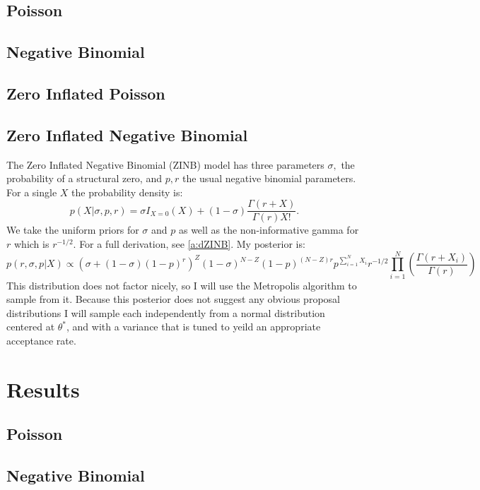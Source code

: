 \documentclass{article}
\begin{document}
\subsection{Poisson}
\label{ss:mPoisson}

\subsection{Negative Binomial}
\label{ss:mNBinom}


\subsection{Zero Inflated Poisson}
\label{ss:mZiPoisson}

\subsection{Zero Inflated Negative Binomial}
\label{ss:mZiNBinom}
The Zero Inflated Negative Binomial (ZINB) model has three parameters $\sigma,$ the probability of a structural zero, and $p,r$ the usual negative binomial parameters. 
For a single $X$ the probability density is: 
$$p(X|\sigma, p, r) = \sigma I_{X=0}(X) + (1-\sigma)\frac{\Gamma(r+X)}{\Gamma(r)X!}.$$
We take the uniform priors for $\sigma$ and $p$ as well as the non-informative gamma for $r$ which is $r^{-1/2}$. For a full derivation, see \ref{a:dZINB}. My posterior is:
$$p(r,\sigma, p|X)\propto\left(\sigma + (1-\sigma)(1-p)^r\right)^Z(1-\sigma)^{N-Z}(1-p)^{(N-Z)r}p^{\sum_{i=1}^NX_i}r^{-1/2}\prod_{i=1}^N\left(\frac{\Gamma(r+X_i)}{\Gamma(r)}\right)$$
This distribution does not factor nicely, so I will use the Metropolis algorithm to sample from it. 
Because this posterior does not suggest any obvious proposal distributions I will sample each independently from a normal distribution centered at $\theta^*$, and with a variance that is tuned to yeild an appropriate acceptance rate.

\section{Results}
\label{s:results}
\subsection{Poisson}
\label{ss:rPoisson}

\subsection{Negative Binomial}
\label{ss:rNBinom}
\end{document}
